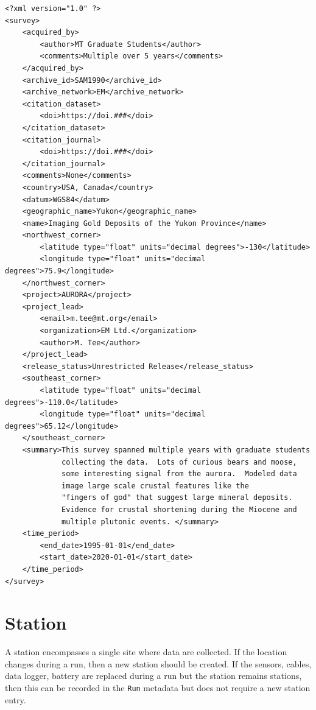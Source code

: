 \documentclass{article}
\begin{document}
\begin{verbatim}
<?xml version="1.0" ?>
<survey>
    <acquired_by>
        <author>MT Graduate Students</author>
        <comments>Multiple over 5 years</comments>
    </acquired_by>
    <archive_id>SAM1990</archive_id>
    <archive_network>EM</archive_network>
    <citation_dataset>
        <doi>https://doi.###</doi>
    </citation_dataset>
    <citation_journal>
        <doi>https://doi.###</doi>
    </citation_journal>
    <comments>None</comments>
    <country>USA, Canada</country>
    <datum>WGS84</datum>
    <geographic_name>Yukon</geographic_name>
    <name>Imaging Gold Deposits of the Yukon Province</name>
    <northwest_corner>
        <latitude type="float" units="decimal degrees">-130</latitude>
        <longitude type="float" units="decimal degrees">75.9</longitude>
    </northwest_corner>
    <project>AURORA</project>
    <project_lead>
        <email>m.tee@mt.org</email>
        <organization>EM Ltd.</organization>
        <author>M. Tee</author>
    </project_lead>
    <release_status>Unrestricted Release</release_status>
    <southeast_corner>
        <latitude type="float" units="decimal degrees">-110.0</latitude>
        <longitude type="float" units="decimal degrees">65.12</longitude>
    </southeast_corner>
    <summary>This survey spanned multiple years with graduate students
             collecting the data.  Lots of curious bears and moose,
             some interesting signal from the aurora.  Modeled data
             image large scale crustal features like the 
             "fingers of god" that suggest large mineral deposits.
             Evidence for crustal shortening during the Miocene and 
             multiple plutonic events. </summary>
    <time_period>
        <end_date>1995-01-01</end_date>
        <start_date>2020-01-01</start_date>
    </time_period>
</survey>
\end{verbatim}

\newpage
\section{Station}

A station encompasses a single site where data are collected. If the location changes during a run, then a new station should be created. If the sensors, cables, data logger, battery are replaced during a run but the station remains stations, then this can be recorded in the \verb|Run| metadata but does not require a new station entry.
\end{document}
